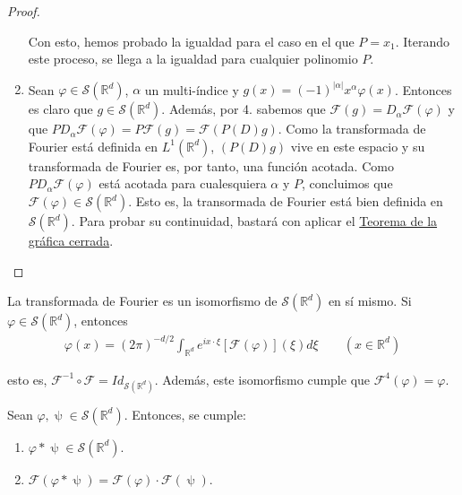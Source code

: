 \begin{proof}
\begin{enumerate}
Con esto, hemos probado la igualdad para el caso en el que $P=x_1$. Iterando este proceso, se llega a la igualdad para cualquier polinomio $P$.

\item Sean $\varphi\in\mathcal{S}(\mathds{R}^d)$, $\alpha$ un multi-índice y $g(x) = (-1)^{\vert\alpha\vert}x^{\alpha}\varphi(x)$. Entonces es claro que $g\in\mathcal{S}(\mathds{R}^{d})$. Además, por 4. sabemos que $\mathcal{F}(g) = D_{\alpha}\mathcal{F}(\varphi)$ y que $PD_{\alpha} \mathcal{F} (\varphi) = P\mathcal{F} (g) = \mathcal{F} (P(D)g)$. Como la transformada de Fourier está definida en $L^1(\mathds{R}^d)$, $(P(D)g)$ vive en este espacio y su transformada de Fourier es, por tanto, una función acotada.  Como $PD_{\alpha}\mathcal{F}(\varphi)$ está acotada para cualesquiera $\alpha$ y $P$, concluimos que $\mathcal{F}(\varphi)\in\mathcal{S}(\mathds{R}^{d})$. Esto es, la transormada de Fourier está bien definida en $\mathcal{S}(\mathds{R}^{d})$. Para probar su continuidad, bastará con aplicar el \hyperref[thm:h06]{Teorema de la gráfica cerrada}. 
\end{enumerate}
\end{proof}

\begin{teorema}\label{thm:d07}
La transformada de Fourier es un isomorfismo de $\mathcal{S}(\mathds{R}^{d})$ en sí mismo. Si $\varphi\in \mathcal{S}(\mathds{R}^{d})$, entonces 
\begin{gather}
\varphi(x) = (2\pi)^{-d/2}\int_{\mathds{R}^{d}} e^{ix\cdot\xi}[\mathcal{F}(\varphi)](\xi)d\xi \qquad (x\in \mathds{R}^{d})
\end{gather}

esto es, $\mathcal{F}^{-1}\circ \mathcal{F} = Id_{\mathcal{S}(\mathds{R}^{d})}$. Además, este isomorfismo cumple que $\mathcal{F}^{4}(\varphi) = \varphi$.
\end{teorema}

\begin{teorema}
    Sean $\varphi,\uppsi\in \mathcal{S}(\mathds{R}^{d})$. Entonces, se cumple:
    \begin{enumerate}
    \item $\varphi * \uppsi \in \mathcal{S}(\mathds{R}^{d})$.
        \item $\mathcal{F}(\varphi * \uppsi) = \mathcal{F}(\varphi) \cdot \mathcal{F}(\uppsi)$.
    \end{enumerate}

\end{teorema}

